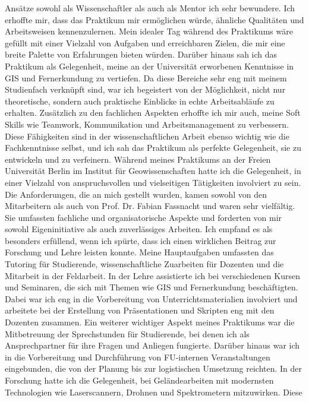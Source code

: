 \documentclass[12pt,a4paper]{report}
\begin{document}
Ansätze sowohl als Wissenschaftler als auch als Mentor ich sehr bewundere. Ich
erhoffte mir, dass das Praktikum mir ermöglichen würde, ähnliche Qualitäten und
Arbeitsweisen kennenzulernen.
%
Mein idealer Tag während des Praktikums wäre gefüllt mit einer Vielzahl von
Aufgaben und erreichbaren Zielen, die mir eine breite Palette von Erfahrungen
bieten würden. Darüber hinaus sah ich das Praktikum als Gelegenheit, meine an
der Universität erworbenen Kenntnisse in GIS und Fernerkundung zu vertiefen. Da
diese Bereiche sehr eng mit meinem Studienfach verknüpft sind, war ich
begeistert von der Möglichkeit, nicht nur theoretische, sondern auch praktische
Einblicke in echte Arbeitsabläufe zu erhalten.
%
Zusätzlich zu den fachlichen Aspekten erhoffte ich mir auch, meine Soft Skills
wie Teamwork, Kommunikation und Arbeitsmanagement zu verbessern. Diese
Fähigkeiten sind in der wissenschaftlichen Arbeit ebenso wichtig wie die
Fachkenntnisse selbst, und ich sah das Praktikum als perfekte Gelegenheit, sie
zu entwickeln und zu verfeinern.
Während meines Praktikums an der Freien Universität Berlin im Institut für
Geowissenschaften hatte ich die Gelegenheit, in einer Vielzahl von
anspruchsvollen und vielseitigen Tätigkeiten involviert zu sein. Die
Anforderungen, die an mich gestellt wurden, kamen sowohl von den Mitarbeitern
als auch von Prof. Dr. Fabian Fassnacht und waren sehr vielfältig. Sie
umfassten fachliche und organisatorische Aspekte und forderten von mir sowohl
Eigeninitiative als auch zuverlässiges Arbeiten. Ich empfand es als besonders
erfüllend, wenn ich spürte, dass ich einen wirklichen Beitrag zur Forschung und
Lehre leisten konnte.
%
Meine Hauptaufgaben umfassten das Tutoring für Studierende, wissenschaftliche
Zuarbeiten für Dozenten und die Mitarbeit in der Feldarbeit. In der Lehre
assistierte ich bei verschiedenen Kursen und Seminaren, die sich mit Themen wie
GIS und Fernerkundung beschäftigten. Dabei war ich eng in die Vorbereitung von
Unterrichtsmaterialien involviert und arbeitete bei der Erstellung von
Präsentationen und Skripten eng mit den Dozenten zusammen.
%
Ein weiterer wichtiger Aspekt meines Praktikums war die Mitbetreuung der
Sprechstunden für Studierende, bei denen ich als Ansprechpartner für ihre
Fragen und Anliegen fungierte. Darüber hinaus war ich in die Vorbereitung und
Durchführung von FU-internen Veranstaltungen eingebunden, die von der Planung
bis zur logistischen Umsetzung reichten.
%
In der Forschung hatte ich die Gelegenheit, bei Geländearbeiten mit modernsten
Technologien wie Laserscannern, Drohnen und Spektrometern mitzuwirken. Diese
\end{document}

